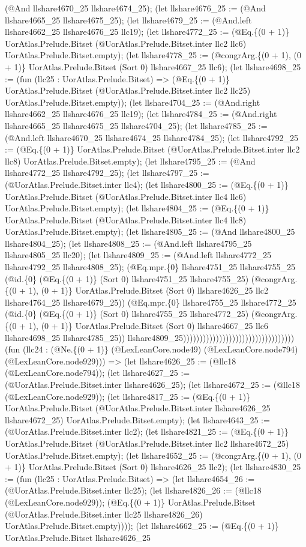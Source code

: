 \documentclass[11pt]{article}
\begin{document}
(@And llshare4670\_25 llshare4674\_25); (let llshare4676\_25 := (@And llshare4665\_25 llshare4675\_25); (let llshare4679\_25 := (@And.left llshare4662\_25 llshare4676\_25 llc19); (let llshare4772\_25 := (@Eq.\{(0 + 1)\} UorAtlas.Prelude.Bitset (@UorAtlas.Prelude.Bitset.inter llc2 llc6) UorAtlas.Prelude.Bitset.empty); (let llshare4778\_25 := (@congrArg.\{(0 + 1), (0 + 1)\} UorAtlas.Prelude.Bitset (Sort 0) llshare4667\_25 llc6); (let llshare4698\_25 := (fun (llc25 : UorAtlas.Prelude.Bitset) => (@Eq.\{(0 + 1)\} UorAtlas.Prelude.Bitset (@UorAtlas.Prelude.Bitset.inter llc2 llc25) UorAtlas.Prelude.Bitset.empty)); (let llshare4704\_25 := (@And.right llshare4662\_25 llshare4676\_25 llc19); (let llshare4784\_25 := (@And.right llshare4665\_25 llshare4675\_25 llshare4704\_25); (let llshare4785\_25 := (@And.left llshare4670\_25 llshare4674\_25 llshare4784\_25); (let llshare4792\_25 := (@Eq.\{(0 + 1)\} UorAtlas.Prelude.Bitset (@UorAtlas.Prelude.Bitset.inter llc2 llc8) UorAtlas.Prelude.Bitset.empty); (let llshare4795\_25 := (@And llshare4772\_25 llshare4792\_25); (let llshare4797\_25 := (@UorAtlas.Prelude.Bitset.inter llc4); (let llshare4800\_25 := (@Eq.\{(0 + 1)\} UorAtlas.Prelude.Bitset (@UorAtlas.Prelude.Bitset.inter llc4 llc6) UorAtlas.Prelude.Bitset.empty); (let llshare4804\_25 := (@Eq.\{(0 + 1)\} UorAtlas.Prelude.Bitset (@UorAtlas.Prelude.Bitset.inter llc4 llc8) UorAtlas.Prelude.Bitset.empty); (let llshare4805\_25 := (@And llshare4800\_25 llshare4804\_25); (let llshare4808\_25 := (@And.left llshare4795\_25 llshare4805\_25 llc20); (let llshare4809\_25 := (@And.left llshare4772\_25 llshare4792\_25 llshare4808\_25); (@Eq.mpr.\{0\} llshare4751\_25 llshare4755\_25 (@id.\{0\} (@Eq.\{(0 + 1)\} (Sort 0) llshare4751\_25 llshare4755\_25) (@congrArg.\{(0 + 1), (0 + 1)\} UorAtlas.Prelude.Bitset (Sort 0) llshare4626\_25 llc2 llshare4764\_25 llshare4679\_25)) (@Eq.mpr.\{0\} llshare4755\_25 llshare4772\_25 (@id.\{0\} (@Eq.\{(0 + 1)\} (Sort 0) llshare4755\_25 llshare4772\_25) (@congrArg.\{(0 + 1), (0 + 1)\} UorAtlas.Prelude.Bitset (Sort 0) llshare4667\_25 llc6 llshare4698\_25 llshare4785\_25)) llshare4809\_25)))))))))))))))))))))))))))))))))) (fun (llc24 : (@Ne.\{(0 + 1)\} (@LexLeanCore.node49) (@LexLeanCore.node794) (@LexLeanCore.node929))) => (let llshare4626\_25 := (@llc18 (@LexLeanCore.node794)); (let llshare4627\_25 := (@UorAtlas.Prelude.Bitset.inter llshare4626\_25); (let llshare4672\_25 := (@llc18 (@LexLeanCore.node929)); (let llshare4817\_25 := (@Eq.\{(0 + 1)\} UorAtlas.Prelude.Bitset (@UorAtlas.Prelude.Bitset.inter llshare4626\_25 llshare4672\_25) UorAtlas.Prelude.Bitset.empty); (let llshare4643\_25 := (@UorAtlas.Prelude.Bitset.inter llc2); (let llshare4821\_25 := (@Eq.\{(0 + 1)\} UorAtlas.Prelude.Bitset (@UorAtlas.Prelude.Bitset.inter llc2 llshare4672\_25) UorAtlas.Prelude.Bitset.empty); (let llshare4652\_25 := (@congrArg.\{(0 + 1), (0 + 1)\} UorAtlas.Prelude.Bitset (Sort 0) llshare4626\_25 llc2); (let llshare4830\_25 := (fun (llc25 : UorAtlas.Prelude.Bitset) => (let llshare4654\_26 := (@UorAtlas.Prelude.Bitset.inter llc25); (let llshare4826\_26 := (@llc18 (@LexLeanCore.node929)); (@Eq.\{(0 + 1)\} UorAtlas.Prelude.Bitset (@UorAtlas.Prelude.Bitset.inter llc25 llshare4826\_26) UorAtlas.Prelude.Bitset.empty)))); (let llshare4662\_25 := (@Eq.\{(0 + 1)\} UorAtlas.Prelude.Bitset llshare4626\_25 
\end{document}
